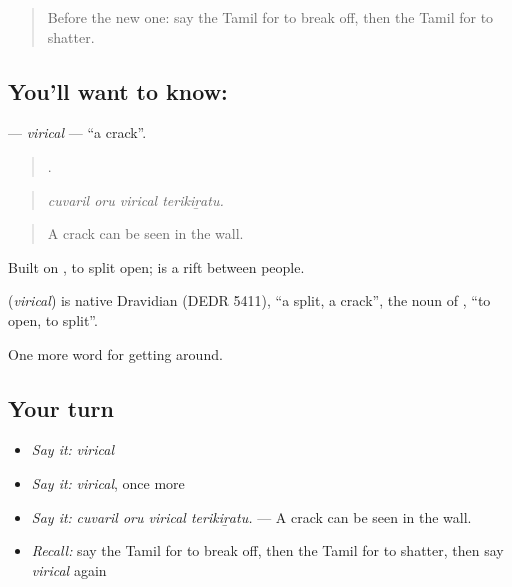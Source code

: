 \label{lesson:TA-C443-virical}



\begin{quote}
Before the new one: say the Tamil for to break off, then the Tamil for to shatter.
\end{quote}

\subsection*{You'll want to know: }
\textbf{} — \emph{virical} — \textquotedblleft{}a crack\textquotedblright{}.

\begin{quote}
   .
\end{quote}

\begin{quote}
\emph{cuvaril oru virical terikiṟatu.}
\end{quote}

\begin{quote}
A crack can be seen in the wall.
\end{quote}

Built on , to split open;   is a rift between people.

\begin{cousinweb}
\textbf{} (\emph{virical}) is native Dravidian (DEDR 5411), \textquotedblleft{}a split, a crack\textquotedblright{}, the noun of , \textquotedblleft{}to open, to split\textquotedblright{}.
\end{cousinweb}

\begin{grammarlens}[title={What you've built}]
One more word for getting around.
\end{grammarlens}

\subsection*{Your turn}
\begin{itemize}
\raggedright
  \item \emph{Say it:} \emph{virical}
  \item \emph{Say it:} \emph{virical}, once more
  \item \emph{Say it:} \emph{cuvaril oru virical terikiṟatu.} — A crack can be seen in the wall.
  \item \emph{Recall:} say the Tamil for to break off, then the Tamil for to shatter, then say \emph{virical} again
\end{itemize}

